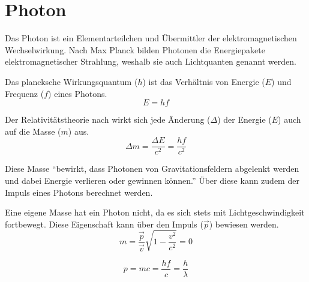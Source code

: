 \section{Photon}
Das Photon ist ein Elementarteilchen und Übermittler der elektromagnetischen Wechselwirkung. Nach Max Planck bilden Photonen die Energiepakete elektromagnetischer Strahlung, weshalb sie auch Lichtquanten genannt werden. 

Das plancksche Wirkungsquantum ($h$) ist das Verhältnis von Energie ($E$) und Frequenz ($f$) eines Photons.
$$E=hf$$
\begin{vardef}
\end{vardef}

Der Relativitätstheorie nach wirkt sich jede Änderung ($\Delta$) der Energie ($E$) auch auf die Masse ($m$) aus.
$${\Delta}m = \frac{{\Delta}E}{c^2} = \frac{hf}{c^2}$$
\begin{vardef}
\end{vardef}

Diese Masse \enquote{bewirkt, dass Photonen von Gravitationsfeldern abgelenkt werden und dabei Energie verlieren oder gewinnen können.} \cite{ulm:photon} Über diese kann zudem der Impuls eines Photons berechnet werden.
$$$$

Eine eigene Masse hat ein Photon nicht, da es sich stets mit Lichtgeschwindigkeit fortbewegt. Diese Eigenschaft kann über den Impuls ($\vec{p}$) bewiesen werden.
$$m = \frac{\vec{p}}{\vec{v}}\sqrt{1-\frac{v^2}{c^2}} = 0$$

$$p=mc=\frac{hf}{c}=\frac{h}{\lambda}$$

